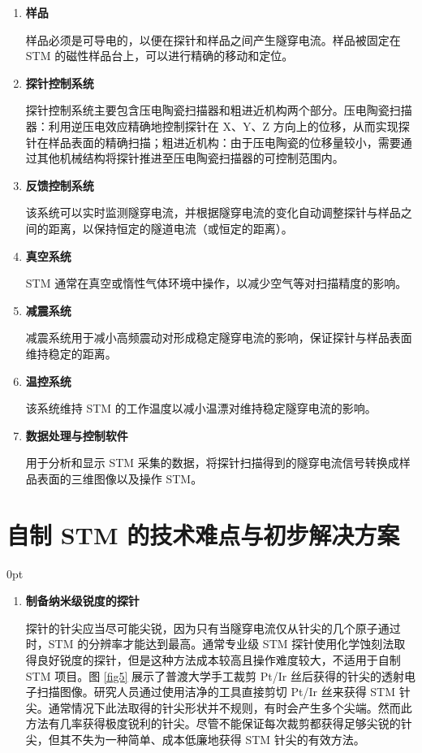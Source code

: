 \documentclass[zihao=-4]{ctexart}
\newcommand{\setParDis}{\setlength {\parskip} {0pt} }
\begin{document}
\begin{spacing}{1.5}
\begin{enumerate}
			 \item \textbf{样品}\par
			 \qquad 样品必须是可导电的，以便在探针和样品之间产生隧穿电流。样品被固定在 STM 的磁性样品台上，可以进行精确的移动和定位。
			 
			 \item \textbf{探针控制系统}\par
			 \qquad 探针控制系统主要包含压电陶瓷扫描器和粗进近机构两个部分。压电陶瓷扫描器：利用逆压电效应精确地控制探针在 X、Y、Z 方向上的位移，从而实现探针在样品表面的精确扫描；粗进近机构：由于压电陶瓷的位移量较小，需要通过其他机械结构将探针推进至压电陶瓷扫描器的可控制范围内。
			 
			 \item \textbf{反馈控制系统}\par
			 \qquad 该系统可以实时监测隧穿电流，并根据隧穿电流的变化自动调整探针与样品之间的距离，以保持恒定的隧道电流（或恒定的距离）。
			 
			 \item \textbf{真空系统}\par
			 \qquad STM 通常在真空或惰性气体环境中操作，以减少空气等对扫描精度的影响。
			 
			 \item \textbf{减震系统}\par
			 \qquad 减震系统用于减小高频震动对形成稳定隧穿电流的影响，保证探针与样品表面维持稳定的距离。
			 
			 \item \textbf{温控系统}\par
			 \qquad 该系统维持 STM 的工作温度以减小温漂对维持稳定隧穿电流的影响。
			 
			 \item \textbf{数据处理与控制软件}\par
			 \qquad 用于分析和显示 STM 采集的数据，将探针扫描得到的隧穿电流信号转换成样品表面的三维图像以及操作 STM。
			 
		\end{enumerate}









	
\clearpage
\section{自制 STM 的技术难点与初步解决方案}
	\setParDis %
	
	\begin{enumerate}
		\item \textbf{制备纳米级锐度的探针}\par
		\qquad 探针的针尖应当尽可能尖锐，因为只有当隧穿电流仅从针尖的几个原子通过时，STM 的分辨率才能达到最高。通常专业级 STM 探针使用化学蚀刻法取得良好锐度的探针，但是这种方法成本较高且操作难度较大，不适用于自制 STM 项目。图 \ref{fig5} 展示了普渡大学手工裁剪 Pt/Ir 丝后获得的针尖的透射电子扫描图像\cite{ref19}。研究人员通过使用洁净的工具直接剪切 Pt/Ir 丝来获得 STM 针尖。通常情况下此法取得的针尖形状并不规则，有时会产生多个尖端。然而此方法有几率获得极度锐利的针尖。尽管不能保证每次裁剪都获得足够尖锐的针尖，但其不失为一种简单、成本低廉地获得 STM 针尖的有效方法。
		

\end{enumerate}
\end{spacing}
\end{document}
